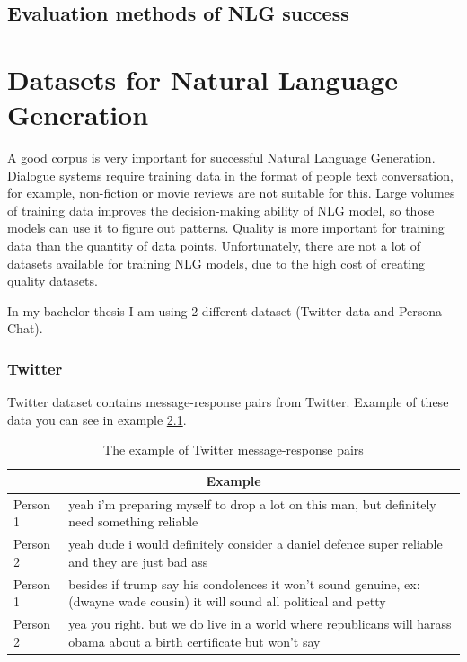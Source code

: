 \section{Evaluation methods of NLG success}

\chapter{Datasets for Natural Language Generation}
A good corpus is very important for successful Natural Language Generation. Dialogue systems require training data in the format of people text conversation, for example, non-fiction or movie reviews are not suitable for this. Large volumes of training data improves the decision-making ability of NLG model, so those models can use it to figure out patterns. Quality is more important for training data than the quantity of data points. Unfortunately, there are not a lot of datasets available for training NLG models, due to the high cost of creating quality datasets. 

In my bachelor thesis I am using 2 different dataset (Twitter data and Persona-Chat). 

\subsection{Twitter}
Twitter dataset contains message-response pairs from Twitter. Example of these data you can see in example \ref{tab:twitter_chat}. 

\begin{table}[t]
\centering
 \begin{tabular}{|p{2cm}|p{8cm}|} 
 \hline
 \multicolumn{2}{|c|}{Example} \\
 \hline
 Person 1 & yeah i'm preparing myself to drop a lot on this man, but definitely need something reliable \\ 
 \hline
 Person 2 & yeah dude i would definitely consider a daniel defence super reliable and they are just bad ass \\
 \hline
 Person 1 & besides if trump say his condolences it won't sound genuine, ex: (dwayne wade cousin) it will sound all political and petty \\
 \hline
 Person 2 & yea you right. but we do live in a world where republicans will harass obama about a birth certificate but won't say \\
 \hline
 \end{tabular}
 \caption{The example of Twitter message-response pairs}
\label{tab:twitter_chat}
\end{table}

